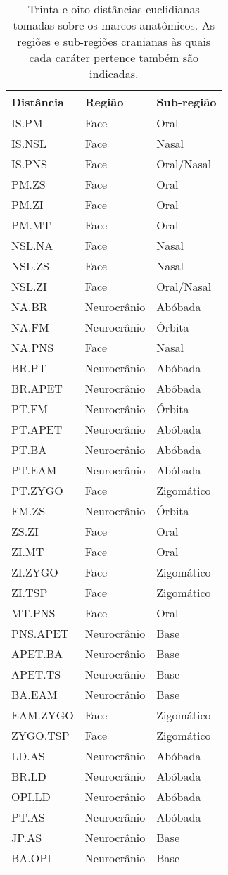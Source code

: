 \begin {table}[hp]
  \centering
  \caption {Trinta e oito distâncias euclidianas tomadas sobre os marcos anatômicos. As regiões e sub-regiões cranianas às quais cada caráter pertence também são indicadas. \label{tab:dist}}
  
  \hr
  \begin {tabularx} {\textwidth} {X X X}
    \bf{Distância} & \bf{Região} & \bf{Sub-região}  \\
    \hline
    IS.PM & Face & Oral \\
    IS.NSL & Face & Nasal \\
    IS.PNS & Face & Oral/Nasal \\
    PM.ZS & Face & Oral \\
    PM.ZI & Face & Oral \\
    PM.MT & Face & Oral \\
    NSL.NA & Face & Nasal \\
    NSL.ZS & Face & Nasal \\
    NSL.ZI & Face & Oral/Nasal \\
    NA.BR & Neurocrânio & Abóbada \\
    NA.FM & Neurocrânio & Órbita \\
    NA.PNS & Face & Nasal \\
    BR.PT & Neurocrânio & Abóbada \\
    BR.APET & Neurocrânio & Abóbada \\
    PT.FM & Neurocrânio & Órbita \\
    PT.APET & Neurocrânio & Abóbada \\
    PT.BA & Neurocrânio & Abóbada \\
    PT.EAM & Neurocrânio & Abóbada \\
    PT.ZYGO & Face & Zigomático \\
    FM.ZS & Neurocrânio & Órbita \\
    ZS.ZI & Face & Oral \\
    ZI.MT & Face & Oral \\
    ZI.ZYGO & Face & Zigomático \\
    ZI.TSP & Face & Zigomático \\
    MT.PNS & Face & Oral \\
    PNS.APET & Neurocrânio & Base \\
    APET.BA & Neurocrânio & Base \\
    APET.TS & Neurocrânio & Base \\
    BA.EAM & Neurocrânio & Base \\
    EAM.ZYGO & Face & Zigomático \\
    ZYGO.TSP & Face & Zigomático \\
    LD.AS & Neurocrânio & Abóbada \\
    BR.LD & Neurocrânio & Abóbada \\
    OPI.LD & Neurocrânio & Abóbada \\
    PT.AS & Neurocrânio & Abóbada \\
    JP.AS & Neurocrânio & Base \\
    BA.OPI & Neurocrânio & Base \\
  \end {tabularx}
  \hr
\end {table} %